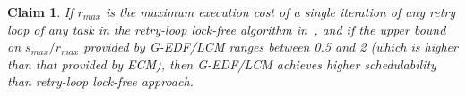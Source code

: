 \documentclass[conference]{sig-alternate}
\newtheorem{clm}{Claim}
\begin{document}
\begin{clm}\label{gedf-lcm-lock-free_clm}
If $r_{max}$ is the maximum execution cost of a single iteration of any retry loop of any task in the retry-loop lock-free algorithm in~\cite{key-5}, and if the upper bound on $s_{max}/r_{max}$ provided by G-EDF/LCM ranges between 0.5 and 2 (which is higher than that provided by ECM), then G-EDF/LCM achieves higher schedulability than retry-loop lock-free approach.
\end{clm}
%

\end{document}
